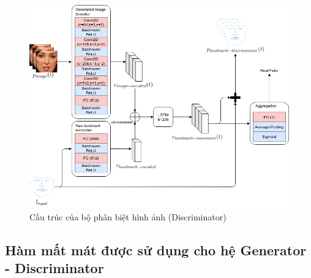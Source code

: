 \begin{figure}[H]
    \centering
    \includegraphics[width=15cm]{./content/materials/discriminator.png}
    \caption{Cấu trúc của bộ phân biệt hình ảnh (Discriminator)}
\end{figure}

\subsection{Hàm mất mát được sử dụng cho hệ Generator - Discriminator}
